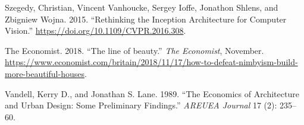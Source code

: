 \documentclass[]{article}
\begin{document}
\leavevmode\hypertarget{ref-Szegedy2015}{}%
Szegedy, Christian, Vincent Vanhoucke, Sergey Ioffe, Jonathon Shlens,
and Zbigniew Wojna. 2015. ``Rethinking the Inception Architecture for
Computer Vision.'' \url{https://doi.org/10.1109/CVPR.2016.308}.

\leavevmode\hypertarget{ref-economistlineofbeauty2018}{}%
The Economist. 2018. ``The line of beauty.'' \emph{The Economist},
November.
\url{https://www.economist.com/britain/2018/11/17/how-to-defeat-nimbyism-build-more-beautiful-houses}.

\leavevmode\hypertarget{ref-Vandell1989}{}%
Vandell, Kerry D., and Jonathan S. Lane. 1989. ``The Economics of
Architecture and Urban Design: Some Preliminary Findings.'' \emph{AREUEA
Journal} 17 (2): 235--60.
\end{document}
